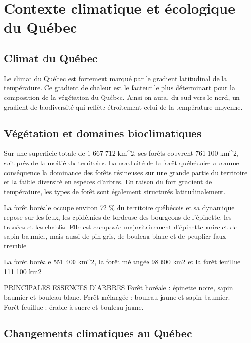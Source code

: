 \hypertarget{contexte-climatique-et-uxe9cologique-du-quuxe9bec}{%
\section{Contexte climatique et écologique du
Québec}\label{contexte-climatique-et-uxe9cologique-du-quuxe9bec}}

\hypertarget{climat-du-quuxe9bec}{%
\subsection{Climat du Québec}\label{climat-du-quuxe9bec}}

Le climat du Québec est fortement marqué par le gradient latitudinal de
la température. Ce gradient de chaleur est le facteur le plus
déterminant pour la composition de la végétation du Québec. Ainsi on
aura, du sud vers le nord, un gradient de biodiversité qui reflète
étroitement celui de la température moyenne.

\hypertarget{vuxe9guxe9tation-et-domaines-bioclimatiques}{%
\subsection{Végétation et domaines
bioclimatiques}\label{vuxe9guxe9tation-et-domaines-bioclimatiques}}

Sur une superficie totale de 1 667 712 km\^{}2, ses forêts couvrent 761
100 km\^{}2, soit près de la moitié du territoire. La nordicité de la
forêt québécoise a comme conséquence la dominance des forêts résineuses
sur une grande partie du territoire et la faible diversité en espèces
d'arbres. En raison du fort gradient de température, les types de forêt
sont également structurés latitudinalement.

La forêt boréale occupe environ 72 \% du territoire québécois et sa
dynamique repose sur les feux, les épidémies de tordeuse des bourgeons
de l'épinette, les trouées et les chablis. Elle est composée
majoritairement d'épinette noire et de sapin baumier, mais aussi de pin
gris, de bouleau blanc et de peuplier faux-tremble

La forêt boréale 551 400 km\^{}2, la forêt mélangée 98 600 km2 et la
forêt feuillue 111 100 km2

PRINCIPALES ESSENCES D'ARBRES Forêt boréale : épinette noire, sapin
baumier et bouleau blanc. Forêt mélangée : bouleau jaune et sapin
baumier. Forêt feuillue : érable à sucre et bouleau jaune.

\hypertarget{changements-climatiques-au-quuxe9bec}{%
\subsection{Changements climatiques au
Québec}\label{changements-climatiques-au-quuxe9bec}}

